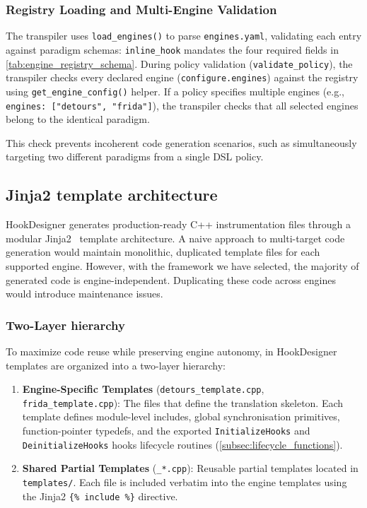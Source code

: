 \subsubsection{Registry Loading and Multi-Engine Validation}

The transpiler uses \texttt{load\_engines()} to parse \texttt{engines.yaml}, validating each entry against paradigm schemas: \texttt{inline\_hook} mandates the four required fields in \cref{tab:engine_registry_schema}.
During policy validation (\texttt{validate\_policy}), the transpiler checks every declared engine (\texttt{configure.engines}) against the registry using \texttt{get\_engine\_config()} helper.
If a policy specifies multiple engines (e.g., \texttt{engines: ["detours", "frida"]}), the transpiler checks that all selected engines belong to the identical paradigm.

This check prevents incoherent code generation scenarios, such as simultaneously targeting two different paradigms from a single DSL policy.

\subsection{Jinja2 template architecture}
\label{subsec:template_composition}

HookDesigner generates production-ready C++ instrumentation files through a modular Jinja2~\cite{repo:jinja2} template architecture.
A naive approach to multi-target code generation would maintain monolithic, duplicated template files for each supported engine.
However, with the framework we have selected, the majority of generated code is engine-independent.
Duplicating these code across engines would introduce maintenance issues.

\subsubsection{Two-Layer hierarchy}

To maximize code reuse while preserving engine autonomy, in HookDesigner templates are organized into a two-layer hierarchy:
\begin{enumerate}
	\item \textbf{Engine-Specific Templates} (\texttt{detours\_template.cpp}, \texttt{frida\_template.cpp}): 
	The files that define the translation skeleton. Each template defines module-level includes, global synchronisation primitives, function-pointer typedefs, and the exported \texttt{InitializeHooks} and \texttt{DeinitializeHooks} hooks lifecycle routines (\cref{subsec:lifecycle_functions}).
	\item \textbf{Shared Partial Templates} (\texttt{\_*.cpp}): Reusable partial templates located in \texttt{templates/}. Each file is included verbatim into the engine templates using the Jinja2 \texttt{\{\% include \%\}} directive.
\end{enumerate}

